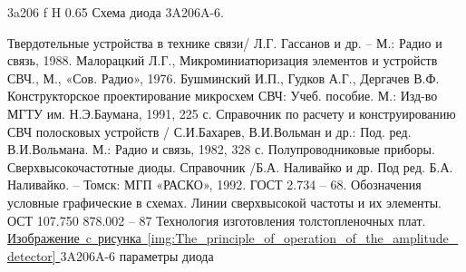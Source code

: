 \documentclass{bmstu}
\begin{document}
	{3a206}
	{f} %
	{H} %
	{0.65\textwidth} %
	{Схема диода 3A206A-6.} %
	
	\begin{thebibliography}{}
		 Твердотельные устройства в технике связи/ Л.Г. Гассанов и др. – М.: Радио и связь, 1988.
		 Малорацкий Л.Г., Микроминиатюризация элементов и устройств СВЧ., М., «Сов. Радио», 1976.
		 Бушминский И.П., Гудков А.Г., Дергачев В.Ф. Конструкторское проектирование микросхем СВЧ: Учеб. пособие. М.: Изд-во МГТУ им. Н.Э.Баумана, 1991, 225 с.
		 Справочник по расчету и конструированию СВЧ полосковых устройств / С.И.Бахарев, В.И.Вольман и др.: Под. ред. В.И.Вольмана. М.: Радио и связь, 1982, 328 с.
		 Полупроводниковые приборы. Сверхвысокочастотные диоды. Справочник /Б.А. Наливайко и др. Под ред. Б.А. Наливайко. – Томск: МГП «РАСКО», 1992.
		 ГОСТ 2.734 – 68. Обозначения условные графические в схемах. Линии сверхвысокой частоты и их элементы.
		 ОСТ 107.750 878.002 – 87   Технология изготовления толстопленочных плат.
		 \href{http://mart7157.narod.ru/voise_10.html}{
			Изображение~c~рисунка~\ref{img:The_principle_of_operation_of_the_amplitude_detector}
		}
		 3A206A-6 параметры диода
	\end{thebibliography}
	
	
\end{document}
